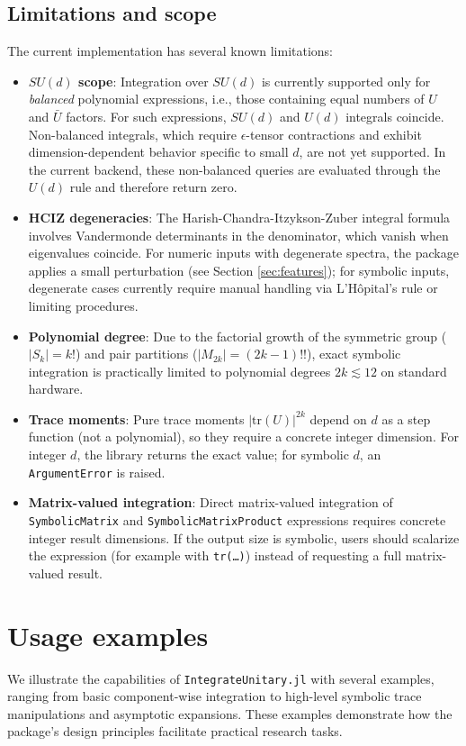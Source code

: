 \documentclass[manuscript,screen]{acmart}
\begin{document}
\subsection{Limitations and scope}
\label{sec:limitations}
The current implementation has several known limitations:
\begin{itemize}
    \item \textbf{$SU(d)$ scope}: Integration over $SU(d)$ is currently
    supported only for \emph{balanced} polynomial expressions, i.e., those
    containing equal numbers of $U$ and $\bar{U}$ factors. For such
    expressions, $SU(d)$ and $U(d)$ integrals coincide. Non-balanced
    integrals, which require $\epsilon$-tensor contractions and exhibit
    dimension-dependent behavior specific to small $d$, are not yet supported.
    In the current backend, these non-balanced queries are evaluated through
    the $U(d)$ rule and therefore return zero.
    \item \textbf{HCIZ degeneracies}: The Harish-Chandra-Itzykson-Zuber
    integral formula involves Vandermonde determinants in the denominator,
    which vanish when eigenvalues coincide. For numeric inputs with degenerate
    spectra, the package applies a small perturbation (see Section
    \ref{sec:features}); for symbolic inputs, degenerate cases currently
    require manual handling via L'H\^{o}pital's rule or limiting procedures.
    \item \textbf{Polynomial degree}: Due to the factorial growth of the
    symmetric group ($|S_k| = k!$) and pair partitions ($|M_{2k}| =
    (2k{-}1)!!$), exact symbolic integration is practically limited to
    polynomial degrees $2k \lesssim 12$ on standard hardware.
    \item \textbf{Trace moments}: Pure trace moments
    $|\mathrm{tr}(U)|^{2k}$ depend on $d$ as a step function (not a
    polynomial), so they require a concrete integer dimension.  For
    integer $d$, the library returns the exact value; for symbolic $d$,
    an \texttt{ArgumentError} is raised.
    \item \textbf{Matrix-valued integration}: Direct matrix-valued integration
    of \texttt{SymbolicMatrix} and \texttt{SymbolicMatrixProduct} expressions
    requires concrete integer result dimensions. If the output size is symbolic,
    users should scalarize the expression (for example with
    \texttt{tr(\ldots)}) instead of requesting a full matrix-valued result.
\end{itemize}

\section{Usage examples}
\label{sec:examples}
We illustrate the capabilities of \texttt{IntegrateUnitary.jl} with several examples, ranging
from basic component-wise integration to high-level symbolic trace manipulations
and asymptotic expansions. These examples demonstrate how the package's design
principles facilitate practical research tasks.
\end{document}
